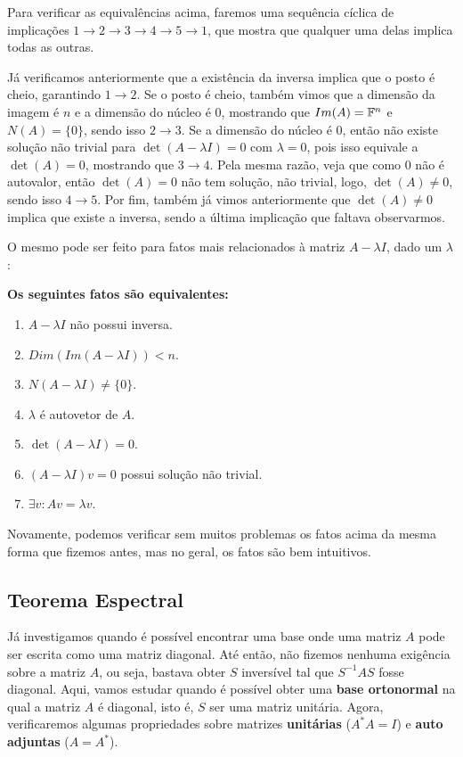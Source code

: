 \documentclass[11pt, a4paper]{article}
\begin{document}
Para verificar as equivalências acima, faremos uma sequência cíclica de implicações \(1 \rightarrow 2 \rightarrow 3 \rightarrow 4 \rightarrow 5 \rightarrow 1\), que mostra que qualquer uma delas implica todas as outras.

Já verificamos anteriormente que a existência da inversa implica que o posto é cheio, garantindo \(1 \rightarrow 2\). Se o posto é cheio, também vimos que a dimensão da imagem é \(n\) e a dimensão do núcleo é 0, mostrando que \(Im(A)=\mathbb{F}^n\) e \(N(A)=\{0\}\), sendo isso \(2\rightarrow 3\). Se a dimensão do núcleo é 0, então não existe solução não trivial para \(\det(A-\lambda I)=0\) com \(\lambda=0\), pois isso equivale a \(\det(A)=0\), mostrando que \(3 \rightarrow 4\). Pela mesma razão, veja que como 0 não é autovalor, então \(\det(A)=0\) não tem solução, não trivial, logo, \(\det(A)\ne 0\), sendo isso \(4 \rightarrow 5\). Por fim, também já vimos anteriormente que \(\det(A)\ne 0\) implica que existe a inversa, sendo a última implicação que faltava observarmos.

O mesmo pode ser feito para fatos mais relacionados à matriz \(A-\lambda I\), dado um \(\lambda\):

\textbf{Os seguintes fatos são equivalentes:}
\begin{enumerate}
    \item \(A-\lambda I\) não possui inversa.
    \item \(Dim(Im(A-\lambda I))<n\).
    \item \(N(A-\lambda I)\ne \{0\}\).
    \item \(\lambda\) é autovetor de \(A\).
    \item \(\det(A-\lambda I)= 0\).
    \item \((A-\lambda I)v=0\) possui solução não trivial.
    \item \(\exists v:Av=\lambda v\).
\end{enumerate}

Novamente, podemos verificar sem muitos problemas os fatos acima da mesma forma que fizemos antes, mas no geral, os fatos são bem intuitivos.

\subsection{Teorema Espectral}

Já investigamos quando é possível encontrar uma base onde uma matriz \(A\) pode ser escrita como uma matriz diagonal. Até então, não fizemos nenhuma exigência sobre a matriz \(A\), ou seja, bastava obter \(S\) inversível tal que \(S^{-1}AS\) fosse diagonal. Aqui, vamos estudar quando é possível obter uma \textbf{base ortonormal} na qual a matriz \(A\) é diagonal, isto é, \(S\) ser uma matriz unitária. Agora, verificaremos algumas propriedades sobre matrizes \textbf{unitárias} (\(A^*A=I\)) e \textbf{auto adjuntas} (\(A=A^*\)).
\end{document}
